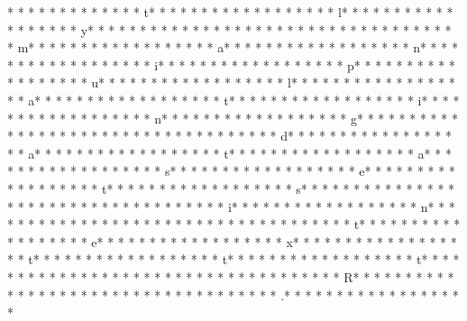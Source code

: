 *  * * *  *  * * *  *  * * *  * t* * *  * * *  * * *  *  * * *  *  * * *  * l* * *  * * *  * * *  *  * * *  *  * * *  * y* * *  * * *  * * *  *  * * *  *  * * *  *  * * *  * * *  * * *  *  * * *  *  * * *  * m* * *  * * *  * * *  *  * * *  *  * * *  * a* * *  * * *  * * *  *  * * *  *  * * *  * n* * *  * * *  * * *  *  * * *  *  * * *  * i* * *  * * *  * * *  *  * * *  *  * * *  * p* * *  * * *  * * *  *  * * *  *  * * *  * u* * *  * * *  * * *  *  * * *  *  * * *  * l* * *  * * *  * * *  *  * * *  *  * * *  * a* * *  * * *  * * *  *  * * *  *  * * *  * t* * *  * * *  * * *  *  * * *  *  * * *  * i* * *  * * *  * * *  *  * * *  *  * * *  * n* * *  * * *  * * *  *  * * *  *  * * *  * g* * *  * * *  * * *  *  * * *  *  * * *  *  * * *  * * *  * * *  *  * * *  *  * * *  * d* * *  * * *  * * *  *  * * *  *  * * *  * a* * *  * * *  * * *  *  * * *  *  * * *  * t* * *  * * *  * * *  *  * * *  *  * * *  * a* * *  * * *  * * *  *  * * *  *  * * *  * s* * *  * * *  * * *  *  * * *  *  * * *  * e* * *  * * *  * * *  *  * * *  *  * * *  * t* * *  * * *  * * *  *  * * *  *  * * *  * s* * *  * * *  * * *  *  * * *  *  * * *  *  * * *  * * *  * * *  *  * * *  *  * * *  * i* * *  * * *  * * *  *  * * *  *  * * *  * n* * *  * * *  * * *  *  * * *  *  * * *  *  * * *  * * *  * * *  *  * * *  *  * * *  * t* * *  * * *  * * *  *  * * *  *  * * *  * e* * *  * * *  * * *  *  * * *  *  * * *  * x* * *  * * *  * * *  *  * * *  *  * * *  * t* * *  * * *  * * *  *  * * *  *  * * *  * t* * *  * * *  * * *  *  * * *  *  * * *  * t* * *  * * *  * * *  *  * * *  *  * * *  * {* * *  * * *  * * *  *  * * *  *  * * *  * R* * *  * * *  * * *  *  * * *  *  * * *  * }* * *  * * *  * * *  *  * * *  *  * * *  * .* * *  * * *  * * *  *  * * *  *  * * *  * 
